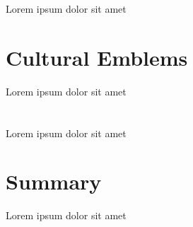 \section{} \label{sec:back_}
\begin{dummied}
    Lorem ipsum dolor sit amet
\end{dummied}

\section{Cultural Emblems} \label{sec:back_}
\begin{dummied}
    Lorem ipsum dolor sit amet
\end{dummied}


\section{} \label{sec:back_}
\begin{dummied}
    Lorem ipsum dolor sit amet
\end{dummied}


\section{Summary} \label{sec:sota_summary}
\begin{dummied}
    Lorem ipsum dolor sit amet
\end{dummied}